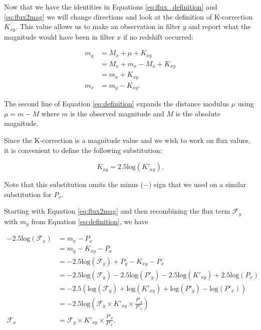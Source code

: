 \documentclass[linenumbers]{aastex631}
\begin{document}
Now that we have the identities in Equations \ref{eq:flux_definition} and
\ref{eq:flux2mag} we will change directions and look at the definition of
K-correction $K_{xy}$. This value allows us to make an observation in filter
$y$ and report what the magnitude would have been in filter $x$ if no redshift
occurred:

\begin{equation}
\begin{aligned}
\label{eq:definition}
  m_y &= M_x + \mu + K_{xy} \\
      &= M_x + m_x - M_x + K_{xy} \\
      &= m_x + K_{xy} \\
  m_x &= m_y - K_{xy} .
\end{aligned}
\end{equation}

\noindent The second line of Equation \ref{eq:definition} expands the distance modulus
$\mu$ using $\mu = m - M$ where $m$ is the observed magnitude and $M$ is the
absolute magnitude.

Since the K-correction is a magnitude value and we wish to work on flux values,
it is convenient to define the following substitution:

\begin{equation}
\label{eq:k_substitution}
  K_{xy} = 2.5\text{log}(K'_{xy}) .
\end{equation}

Note that this substitution omits the minus ($-$) sign that we used on a
similar substitution for $P_x$.

Starting with Equation \ref{eq:flux2mag} and then
recombining the flux term $\mathcal{F}_y$ with $m_y$ from Equation
\ref{eq:definition}, we have

\begin{equation}
\begin{aligned}
\label{eq:as_flux}
  -2.5 \text{log}(\mathcal{F}_x)
      &= m_x - P_x \\
      &= m_y - K_{xy} - P_x \\
      &= -2.5 \text{log}(\mathcal{F}_y) + P_y - K_{xy} - P_x \\
      &= -2.5 \text{log}(\mathcal{F}_y)
         - 2.5 \text{log}(P'_y)
         - 2.5 \text{log}(K'_{xy})
         + 2.5 \text{log}(P_x) \\
      &= -2.5 \left(
         \text{log}(\mathcal{F}_y)
         + \text{log}(K'_{xy})
         + \text{log}(P'_y)
         - \text{log}(P'_x)
        \right) \\
      &= -2.5 \text{log}\left(
        \mathcal{F}_y
        \times K'_{xy}
        \times \frac{P'_y}{P'_x}\right) \\
  \mathcal{F}_x &= \mathcal{F}_y \times K'_{xy} \times \frac{P'_y}{P'_x}.
\end{aligned}
\end{equation}
\end{document}
